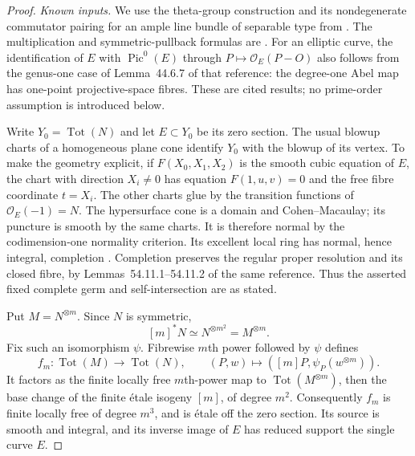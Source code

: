 \begin{proof}
\emph{Known inputs.}
We use the theta-group construction and its nondegenerate
commutator pairing for an ample line bundle of separable type
from \citet[\S1, pp.~288--295, especially Theorem~1 and its proof]
{D_Mumford1966ThetaCone}.
The multiplication and symmetric-pullback formulas are
\citet[Lemmas~39.9.7--39.9.9 and Proposition~39.9.11]
{D_StacksEllipticThetaCone}.
For an elliptic curve, the identification of $E$ with
$\operatorname{Pic}^0(E)$ through $P\mapsto\mathcal O_E(P-O)$
also follows from the genus-one case of Lemma~44.6.7 of that
reference: the degree-one Abel map has one-point projective-space
fibres. These are cited results; no prime-order assumption is
introduced below.

Write $Y_0=\operatorname{Tot}(N)$ and let $E\subset Y_0$ be its
zero section. The usual blowup charts of a homogeneous plane
cone identify $Y_0$ with the blowup of its vertex. To make the
geometry explicit, if $F(X_0,X_1,X_2)$ is the smooth cubic
equation of $E$, the chart with direction $X_i\ne0$ has equation
$F(1,u,v)=0$ and the free fibre coordinate $t=X_i$.
The other charts glue by the transition functions of
$\mathcal O_E(-1)=N$.
The hypersurface cone is a domain and Cohen--Macaulay; its
puncture is smooth by the same charts. It is therefore normal
by the codimension-one normality criterion. Its excellent
local ring has normal, hence integral, completion
\citep[Lemma~15.53.6, Tag~0C23]{D_StacksEllipticThetaCone}.
Completion preserves the regular proper resolution and its
closed fibre, by Lemmas~54.11.1--54.11.2 of the same reference.
Thus the asserted fixed complete germ and self-intersection
are as stated.

Put $M=N^{\otimes m}$. Since $N$ is symmetric,
\[
        [m]^*N\simeq N^{\otimes m^2}=M^{\otimes m}.
                                                               \tag{D.EC.2}
\]
Fix such an isomorphism $\psi$. Fibrewise $m$th power followed
by $\psi$ defines
\[
 f_m:\operatorname{Tot}(M)\longrightarrow\operatorname{Tot}(N),
 \qquad (P,w)\longmapsto([m]P,\psi_P(w^{\otimes m})).
                                                               \tag{D.EC.3}
\]
It factors as the finite locally free $m$th-power map to
$\operatorname{Tot}(M^{\otimes m})$, then the base change of
the finite \'etale isogeny $[m]$, of degree $m^2$.
Consequently $f_m$ is finite locally free of degree $m^3$,
and is \'etale off the zero section. Its source is smooth
and integral, and its inverse image of $E$ has reduced
support the single curve $E$.


\end{proof}
